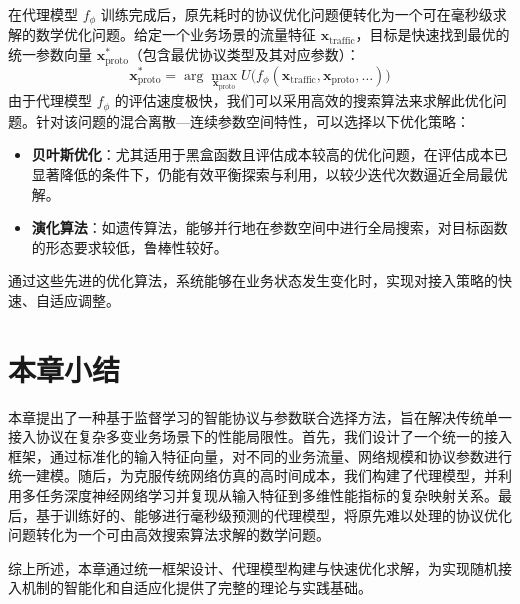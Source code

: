在代理模型 $f_{\phi}$ 训练完成后，原先耗时的协议优化问题便转化为一个可在毫秒级求解的数学优化问题。给定一个业务场景的流量特征 $\bm{x}_\text{traffic}$，目标是快速找到最优的统一参数向量 $\mathbf{x}_{\text{proto}}^*$（包含最优协议类型及其对应参数）：
\begin{equation}
	\mathbf{x}_{\text{proto}}^* = \arg\max_{\mathbf{x}_{\text{proto}}} U\big(f_{\phi}(\bm{x}_{\text{traffic}}, \mathbf{x}_{\text{proto}}, \dots)\big)
\end{equation}
由于代理模型 $f_{\phi}$ 的评估速度极快，我们可以采用高效的搜索算法来求解此优化问题。针对该问题的混合离散—连续参数空间特性，可以选择以下优化策略：
\begin{itemize}[leftmargin=*]
	\item \textbf{贝叶斯优化}：尤其适用于黑盒函数且评估成本较高的优化问题，在评估成本已显著降低的条件下，仍能有效平衡探索与利用，以较少迭代次数逼近全局最优解。
	\item \textbf{演化算法}：如遗传算法，能够并行地在参数空间中进行全局搜索，对目标函数的形态要求较低，鲁棒性较好。
\end{itemize}
通过这些先进的优化算法，系统能够在业务状态发生变化时，实现对接入策略的快速、自适应调整。

\section{本章小结}

本章提出了一种基于监督学习的智能协议与参数联合选择方法，旨在解决传统单一接入协议在复杂多变业务场景下的性能局限性。首先，我们设计了一个统一的接入框架，通过标准化的输入特征向量，对不同的业务流量、网络规模和协议参数进行统一建模。随后，为克服传统网络仿真的高时间成本，我们构建了代理模型，并利用多任务深度神经网络学习并复现从输入特征到多维性能指标的复杂映射关系。最后，基于训练好的、能够进行毫秒级预测的代理模型，将原先难以处理的协议优化问题转化为一个可由高效搜索算法求解的数学问题。

综上所述，本章通过统一框架设计、代理模型构建与快速优化求解，为实现随机接入机制的智能化和自适应化提供了完整的理论与实践基础。
